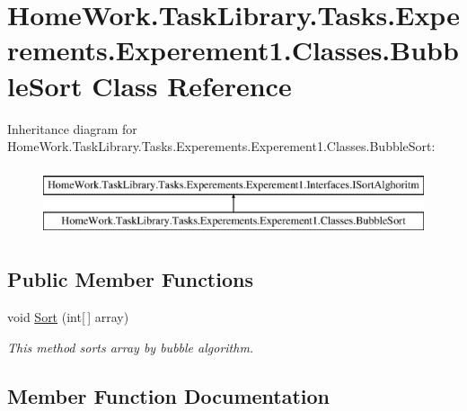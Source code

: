 \hypertarget{class_home_work_1_1_task_library_1_1_tasks_1_1_experements_1_1_experement1_1_1_classes_1_1_bubble_sort}{}\section{Home\+Work.\+Task\+Library.\+Tasks.\+Experements.\+Experement1.\+Classes.\+Bubble\+Sort Class Reference}
\label{class_home_work_1_1_task_library_1_1_tasks_1_1_experements_1_1_experement1_1_1_classes_1_1_bubble_sort}
Inheritance diagram for Home\+Work.\+Task\+Library.\+Tasks.\+Experements.\+Experement1.\+Classes.\+Bubble\+Sort\+:\begin{figure}[H]
\begin{center}
\leavevmode
\includegraphics[height=2.000000cm]{class_home_work_1_1_task_library_1_1_tasks_1_1_experements_1_1_experement1_1_1_classes_1_1_bubble_sort}
\end{center}
\end{figure}
\subsection*{Public Member Functions}
\begin{DoxyCompactItemize}
\item 
void \mbox{\hyperlink{class_home_work_1_1_task_library_1_1_tasks_1_1_experements_1_1_experement1_1_1_classes_1_1_bubble_sort_a16f8f78393f69415edc9bd35c6ea3d19}{Sort}} (int\mbox{[}$\,$\mbox{]} array)
\begin{DoxyCompactList}\small\item\em This method sorts array by bubble algorithm. \end{DoxyCompactList}\end{DoxyCompactItemize}


\subsection{Member Function Documentation}
\mbox{\label{class_home_work_1_1_task_library_1_1_tasks_1_1_experements_1_1_experement1_1_1_classes_1_1_bubble_sort_a16f8f78393f69415edc9bd35c6ea3d19}} 
